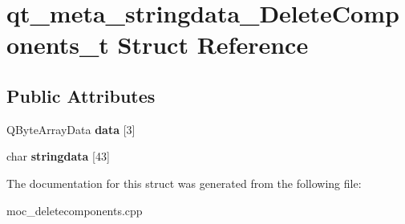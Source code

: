 \hypertarget{structqt__meta__stringdata__DeleteComponents__t}{\section{qt\-\_\-meta\-\_\-stringdata\-\_\-\-Delete\-Components\-\_\-t Struct Reference}
\label{structqt__meta__stringdata__DeleteComponents__t}
}
\subsection*{Public Attributes}
\begin{DoxyCompactItemize}
\item 
\hypertarget{structqt__meta__stringdata__DeleteComponents__t_af6c97bc53324cc1645c2cb3af2b76440}{Q\-Byte\-Array\-Data {\bfseries data} \mbox{[}3\mbox{]}}\label{structqt__meta__stringdata__DeleteComponents__t_af6c97bc53324cc1645c2cb3af2b76440}

\item 
\hypertarget{structqt__meta__stringdata__DeleteComponents__t_a78d3eb4df0fc087d4b3e953fe71815f6}{char {\bfseries stringdata} \mbox{[}43\mbox{]}}\label{structqt__meta__stringdata__DeleteComponents__t_a78d3eb4df0fc087d4b3e953fe71815f6}

\end{DoxyCompactItemize}


The documentation for this struct was generated from the following file\-:\begin{DoxyCompactItemize}
\item 
moc\-\_\-deletecomponents.\-cpp\end{DoxyCompactItemize}
